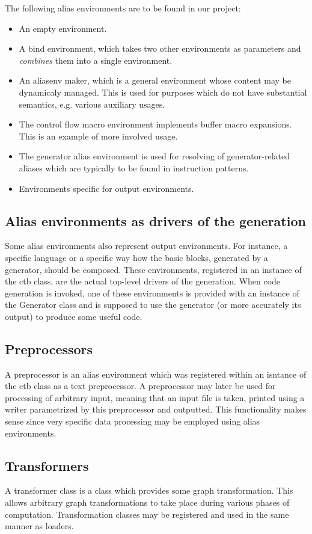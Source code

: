 The following alias environments are to be found in our project:
\begin{itemize}
  \item An empty environment.
  \item A bind environment, which takes two other environments as parameters and \emph{combines} them into a single environment.
  \item An aliasenv maker, which is a general environment whose content may be dynamicaly managed. This is used for purposes which do not have substantial semantics, e.g. various auxiliary usages. 
  \item The control flow macro environment implements buffer macro expansions. This is an example of more involved usage.
  \item The generator alias environment is used for resolving of generator-related aliases which are typically to be found in instruction patterns.
  \item Environments specific for output environments.
\end{itemize}

\subsection{Alias environments as drivers of the generation}
  Some alias environments also represent output environments. For instance, a specific language or a specific way how the basic blocks, generated by a generator, should be composed. These environments, registered in an instance of the ctb class, are the actual top-level drivers of the generation. When code generation is invoked, one of these environments is provided with an instance of the Generator class and is supposed to use the generator (or more accurately its output) to produce some useful code. 

\subsection{Preprocessors}
  A preprocessor is an alias environment which was registered within an isntance of the ctb class as a text preprocessor. A preprocessor may later be used for processing of arbitrary input, meaning that an input file is taken, printed using a writer parametrized by this preprocessor and outputted. This functionality makes sense since very specific data processing may be employed using alias environments.

\subsection{Transformers}
  A transformer class is a class which provides some graph transformation. This allows arbitrary graph transformations to take place during various phases of computation. Transformation classes may be registered and used in the same manner as loaders.


